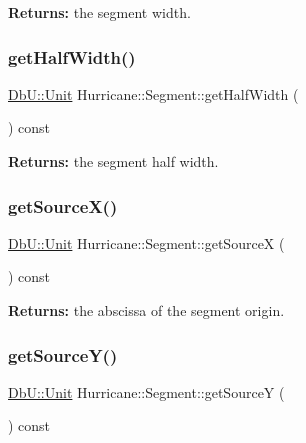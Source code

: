 {\bfseries Returns\+:} the segment width. \mbox{\label{classHurricane_1_1Segment_a58e4abcf545ad5c89ca2854a2b4471f8}} 
\subsubsection{\texorpdfstring{get\+Half\+Width()}{getHalfWidth()}}
{\footnotesize\ttfamily \mbox{\hyperlink{group__DbUGroup_ga4fbfa3e8c89347af76c9628ea06c4146}{Db\+U\+::\+Unit}} Hurricane\+::\+Segment\+::get\+Half\+Width (\begin{DoxyParamCaption}{ }\end{DoxyParamCaption}) const\hspace{0.3cm}{\ttfamily [inline]}}

{\bfseries Returns\+:} the segment half width. \mbox{\label{classHurricane_1_1Segment_a0347e3bde8e2e90b05cffdaf2d048710}} 
\subsubsection{\texorpdfstring{get\+Source\+X()}{getSourceX()}}
{\footnotesize\ttfamily \mbox{\hyperlink{group__DbUGroup_ga4fbfa3e8c89347af76c9628ea06c4146}{Db\+U\+::\+Unit}} Hurricane\+::\+Segment\+::get\+SourceX (\begin{DoxyParamCaption}{ }\end{DoxyParamCaption}) const\hspace{0.3cm}{\ttfamily [pure virtual]}}

{\bfseries Returns\+:} the abscissa of the segment origin. \mbox{\label{classHurricane_1_1Segment_abf305dd4510de6fe6fae5286acbe285a}} 
\subsubsection{\texorpdfstring{get\+Source\+Y()}{getSourceY()}}
{\footnotesize\ttfamily \mbox{\hyperlink{group__DbUGroup_ga4fbfa3e8c89347af76c9628ea06c4146}{Db\+U\+::\+Unit}} Hurricane\+::\+Segment\+::get\+SourceY (\begin{DoxyParamCaption}{ }\end{DoxyParamCaption}) const\hspace{0.3cm}{\ttfamily [pure virtual]}}


